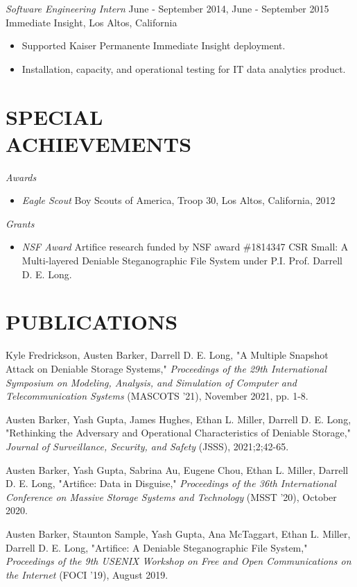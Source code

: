 \documentclass[margin, 10pt]{res} %
\begin{document}
\begin{resume}
{\sl Software Engineering Intern} \hfill June - September 2014, June - September 2015 \\
Immediate Insight, Los Altos, California
\begin{itemize}
\item Supported Kaiser Permanente Immediate Insight deployment.
\item Installation, capacity, and operational testing for IT data analytics product.
\end{itemize}

\section{SPECIAL \\ ACHIEVEMENTS} 
{\sl Awards}
\begin{itemize}
\item \emph{Eagle Scout} Boy Scouts of America, Troop 30, Los Altos, California, 2012
\end{itemize}
{\sl Grants}
\begin{itemize}
\item \emph{NSF Award} Artifice research funded by NSF award \#1814347 CSR Small: A Multi-layered Deniable Steganographic File System under P.I. Prof. Darrell D. E. Long.
\end{itemize}


\section{PUBLICATIONS}
\begin{etaremune}
\item Kyle Fredrickson, Austen Barker, Darrell D. E. Long, "A Multiple Snapshot Attack on Deniable Storage Systems," \emph{Proceedings of the 29th International Symposium on Modeling, Analysis, and Simulation of Computer and 
Telecommunication Systems} (MASCOTS '21), November 2021, pp. 1-8.
\item Austen Barker, Yash Gupta, James Hughes, Ethan L. Miller, Darrell D. E. Long, "Rethinking the Adversary and Operational Characteristics of Deniable Storage," \emph{Journal of Surveillance, Security, and Safety} (JSSS), 2021;2;42-65.
\item Austen Barker, Yash Gupta, Sabrina Au, Eugene Chou, Ethan L. Miller, Darrell D. E. Long, "Artifice: Data in Disguise," \emph{Proceedings of the 36th International Conference on Massive Storage Systems and Technology} (MSST '20), October 2020.
\item Austen Barker, Staunton Sample, Yash Gupta, Ana McTaggart, Ethan L. Miller, Darrell D. E. Long, "Artifice: A Deniable Steganographic File System," \emph{Proceedings of the 9th USENIX Workshop on Free and Open Communications on the Internet} (FOCI '19), August 2019.
\end{etaremune}
\end{resume}
\end{document}
